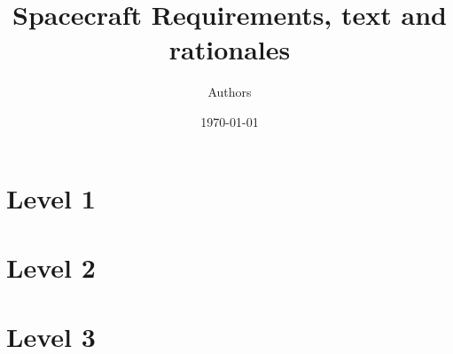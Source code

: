 \documentclass{beamer}
\title{ Spacecraft Requirements, text and rationales}
\author{Authors}
\date{\today}
\begin{document}

\frame{\titlepage}

\section[Outline]{}
\section{Level 1}

\section{Level 2}

\section{Level 3}

\end{document}
